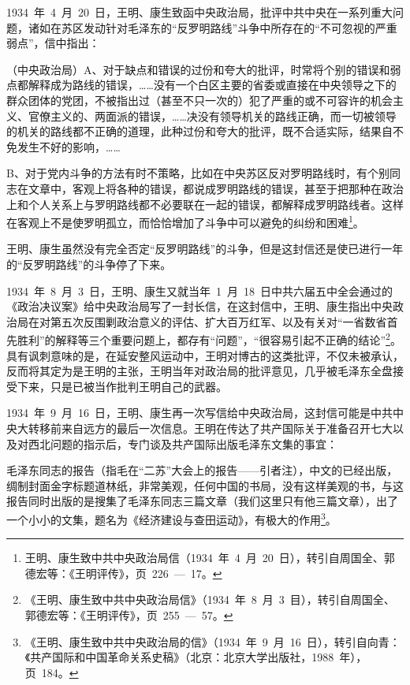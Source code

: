 1934~年~4~月~20~日，王明、康生致函中央政治局，批评中共中央在一系列重大问题，诸如在苏区发动针对毛泽东的“反罗明路线”斗争中所存在的“不可忽视的严重弱点”，信中指出：

\begin{quoting}
（中央政治局）A、对于缺点和错误的过份和夸大的批评，时常将个别的错误和弱点都解释成为路线的错误，……没有一个白区主要的省委或直接在中央领导之下的群众团体的党团，不被指出过（甚至不只一次的）犯了严重的或不可容许的机会主义、官僚主义的、两面派的错误，……决没有领导机关的路线正确，而一切被领导的机关的路线都不正确的道理，此种过份和夸大的批评，既不合适实际，结果自不免发生不好的影响，……

B、对于党内斗争的方法有时不策略，比如在中央苏区反对罗明路线时，有个别同志在文章中，客观上将各种的错误，都说成罗明路线的错误，甚至于把那种在政治上和个人关系上与罗明路线都不必要联在一起的错误，都解释成罗明路线者。这样在客观上不是使罗明孤立，而恰恰增加了斗争中可以避免的纠纷和困难\footnote{王明、康生致中共中央政治局信（1934~年~4~月~20~日），转引自周国全、郭德宏等：《王明评传》，页~226~—~17。}。
\end{quoting}

王明、康生虽然没有完全否定“反罗明路线”的斗争，但是这封信还是使已进行一年的“反罗明路线”的斗争停了下来。

1934~年~8~月~3~日，王明、康生又就当年~1~月~18~日中共六届五中全会通过的《政治决议案》给中央政治局写了一封长信，在这封信中，王明、康生指出中央政治局在对第五次反围剿政治意义的评估、扩大百万红军、以及有关对“一省数省首先胜利”的解释等三个重要问题上，都存有“问题”，“很容易引起不正确的结论”\footnote{《王明、康生致中共中央政治局信》（1934~年~8~月~3~目），转引自周国全、郭德宏等：《王明评传》，页~255~—~57。}。具有讽刺意味的是，在延安整风运动中，王明对博古的这类批评，不仅未被承认，反而将其定为是王明的主张，王明当年对政治局的批评意见，几乎被毛泽东全盘接受下来，只是已被当作批判王明自己的武器。

1934~年~9~月~16~日，王明、康生再一次写信给中央政治局，这封信可能是中共中央大转移前来自远方的最后一次信息。王明在传达了共产国际关于准备召开七大以及对西北问题的指示后，专门谈及共产国际出版毛泽东文集的事宜：

\begin{quoting}
毛泽东同志的报告（指毛在“二苏”大会上的报告——引者注），中文的已经出版，绸制封面金字标题道林纸，非常美观，任何中国的书局，没有这样美观的书，与这报告同时出版的是搜集了毛泽东同志三篇文章（我们这里只有他三篇文章），出了一个小小的文集，题名为《经济建设与查田运动》，有极大的作用\footnote{《王明、康生致中共中央政治局的信》（1934~年~9~月~16~日），转引自向青：《共产国际和中国革命关系史稿》（北京：北京大学出版社，1988~年），页~184。}。
\end{quoting}

